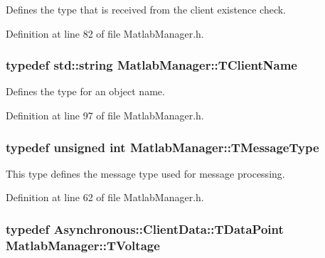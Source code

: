 Defines the type that is received from the client existence check. 



Definition at line 82 of file Matlab\-Manager.\-h.

\hypertarget{class_matlab_manager_a62cb494115d46fdf4ecc6bd369fe0320}{
\subsubsection[{T\-Client\-Name}]{\setlength{\rightskip}{0pt plus 5cm}typedef std\-::string {\bf Matlab\-Manager\-::\-T\-Client\-Name}}}\label{class_matlab_manager_a62cb494115d46fdf4ecc6bd369fe0320}


Defines the type for an object name. 



Definition at line 97 of file Matlab\-Manager.\-h.

\hypertarget{class_matlab_manager_a36ad68398613c0d0ede6077af22d830c}{
\subsubsection[{T\-Message\-Type}]{\setlength{\rightskip}{0pt plus 5cm}typedef unsigned int {\bf Matlab\-Manager\-::\-T\-Message\-Type}\hspace{0.3cm}{\ttfamily [private]}}}\label{class_matlab_manager_a36ad68398613c0d0ede6077af22d830c}


This type defines the message type used for message processing. 



Definition at line 62 of file Matlab\-Manager.\-h.

\hypertarget{class_matlab_manager_a716643f4f29af3225aedf52d61fd0abe}{
\subsubsection[{T\-Voltage}]{\setlength{\rightskip}{0pt plus 5cm}typedef {\bf Asynchronous\-::\-Client\-Data\-::\-T\-Data\-Point} {\bf Matlab\-Manager\-::\-T\-Voltage}}}\label{class_matlab_manager_a716643f4f29af3225aedf52d61fd0abe}


